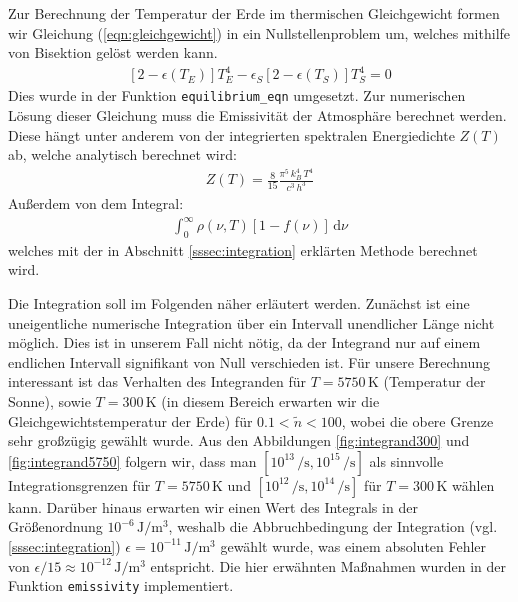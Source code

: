 \documentclass[10pt,a4paper]{article}
\begin{document}
Zur Berechnung der Temperatur der Erde im thermischen Gleichgewicht formen wir Gleichung (\ref{eqn:gleichgewicht}) in ein Nullstellenproblem um, welches mithilfe von Bisektion gelöst werden kann.
\begin{align}
	\left[2-\epsilon(T_E)\right]T_E^4 - \epsilon_S\left[2-\epsilon(T_S)\right]T_S^4 = 0
	\label{eq:nullstellenproblem}
\end{align}
Dies wurde in der Funktion \texttt{equilibrium\_eqn} umgesetzt. Zur numerischen Lösung dieser Gleichung muss die Emissivität der Atmosphäre berechnet werden. Diese hängt unter anderem von der integrierten spektralen Energiedichte $Z(T)$ ab, welche analytisch berechnet wird:
\begin{align}
	Z(T) = \frac{8}{15} \frac{\pi^5 \, k_B^4 \, T^4}{c^3 \, h^3}
\end{align}
Außerdem von dem Integral:
\begin{align}
	\int_0^\infty \rho(\nu,T)[1 - f(\nu)] \, \mathrm{d}\nu
\end{align}
welches mit der in Abschnitt \ref{sssec:integration} erklärten Methode berechnet wird.

Die Integration soll im Folgenden näher erläutert werden. Zunächst ist eine uneigentliche numerische Integration über ein Intervall unendlicher Länge nicht möglich. Dies ist in unserem Fall nicht nötig, da der Integrand nur auf einem endlichen Intervall signifikant von Null verschieden ist. Für unsere Berechnung interessant ist das Verhalten des Integranden für $T = \num{5750}\,\si{\kelvin}$ (Temperatur der Sonne), sowie $T = \num{300}\,\si{\kelvin}$ (in diesem Bereich erwarten wir die Gleichgewichtstemperatur der Erde) für $\num{0.1} < \tilde{n} < \num{100}$, wobei die obere Grenze sehr großzügig gewählt wurde. Aus den Abbildungen \ref{fig:integrand300} und \ref{fig:integrand5750} folgern wir, dass man $[10^{13}\,\si{\per\second},10^{15}\,\si{\per\second}]$ als sinnvolle Integrationsgrenzen für $T = \num{5750}\,\si{\kelvin}$ und $[10^{12}\,\si{\per\second}, 10^{14}\,\si{\per\second}]$ für $T = \num{300}\,\si{\kelvin}$ wählen kann. Darüber hinaus erwarten wir einen Wert des Integrals in der Größenordnung $10^{-6}\,\si{\joule\per\metre^3}$, weshalb die Abbruchbedingung der Integration (vgl. \ref{sssec:integration}) $\epsilon = 10^{-11}\,\si{\joule\per\metre^3}$ gewählt wurde, was einem absoluten Fehler von $\epsilon / 15 \approx 10^{-12}\,\si{\joule\per\metre^3}$ entspricht. Die hier erwähnten Maßnahmen wurden in der Funktion \texttt{emissivity} implementiert.
\end{document}
